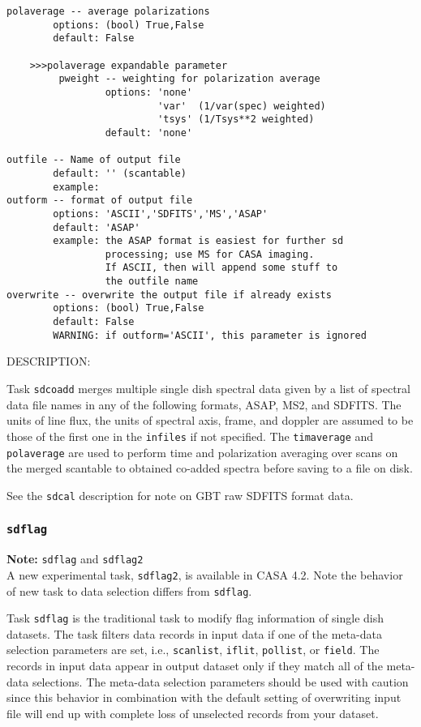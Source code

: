 \begin{verbatim}
polaverage -- average polarizations
        options: (bool) True,False
        default: False

    >>>polaverage expandable parameter
         pweight -- weighting for polarization average
                 options: 'none'
                          'var'  (1/var(spec) weighted)
                          'tsys' (1/Tsys**2 weighted)
                 default: 'none'

outfile -- Name of output file
        default: '' (scantable)
        example:
outform -- format of output file
        options: 'ASCII','SDFITS','MS','ASAP'
        default: 'ASAP'
        example: the ASAP format is easiest for further sd
                 processing; use MS for CASA imaging.
                 If ASCII, then will append some stuff to
                 the outfile name
overwrite -- overwrite the output file if already exists
        options: (bool) True,False
        default: False
        WARNING: if outform='ASCII', this parameter is ignored 
\end{verbatim}

DESCRIPTION:

Task {\tt sdcoadd} merges multiple single dish spectral data given by
a list of spectral data file names in any of the following formats,
ASAP, MS2, and SDFITS.
The units of line flux, the units of spectral axis, frame, and doppler
are assumed to be those of the first one in the {\tt infiles} if not
specified.
The {\tt timaverage} and {\tt polaverage} are used to perform time
and polarization averaging over scans on the merged scantable to 
obtained co-added spectra before saving to a file on disk.

See the {\tt sdcal} description for note on GBT raw SDFITS format data.


\subsubsection{{\tt sdflag}}
\label{section:sd.sdtasks.tasks.sdflag}

{\bf Note:} {\tt sdflag} and {\tt sdflag2}\\
A new experimental task, {\tt sdflag2}, is available in CASA 4.2. 
Note the behavior of new task to data selection differs from {\tt sdflag}.

Task {\tt sdflag} is the traditional task to modify flag information of
single dish datasets. The task filters data records in input data if one
of the meta-data selection parameters are set, i.e., {\tt scanlist}, 
{\tt iflit}, {\tt pollist}, or {\tt field}. 
The records in input data appear in output dataset only if they match
all of the meta-data selections. The meta-data selection parameters should
be used with caution since this behavior in combination with the default 
setting of overwriting input file will end up with complete
loss of unselected records from your dataset.


